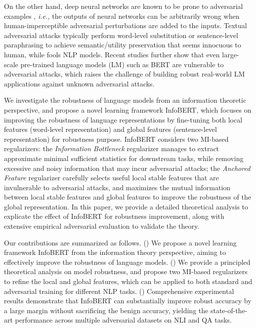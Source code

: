 \documentclass{article} \usepackage{iclr2021_conference,times}
\theoremstyle{definition}
\theoremstyle{remark}
\newcommand{\method}{InfoBERT\xspace}
\begin{document}
On the other hand, deep neural networks are known to be prone to adversarial examples \citep{Goodfellow2015ExplainingAH,Papernot2016DistillationAA,Eykholt2017RobustPA,MoosaviDezfooli2016DeepFoolAS}, \emph{i.e.,} the outputs of neural networks can be arbitrarily wrong when human-imperceptible adversarial perturbations are added to the inputs. Textual adversarial attacks typically perform word-level substitution \citep{hotflip, DBLP:conf/emnlp/AlzantotSEHSC18,weight_attack} or sentence-level paraphrasing \citep{scpn,DBLP:conf/naacl/ZhangBH19} to achieve semantic/utility preservation that seems innocuous to human, while fools NLP models. Recent studies \citep{textfooler, comattack, anli, t3} further show that even large-scale pre-trained language models (LM) such as BERT are vulnerable to adversarial attacks, which raises the challenge of building robust real-world LM applications against unknown adversarial attacks.

We investigate the robustness of language models from an information theoretic perspective, and propose a novel learning framework \method, which focuses on improving the robustness of language representations by fine-tuning both local features (word-level representation) and global features (sentence-level representation) for robustness purpose. \method considers two MI-based regularizers:  the \emph{Information Bottleneck} regularizer manages to extract approximate minimal sufficient statistics for downstream tasks, while removing excessive and noisy information that may incur adversarial attacks;  the \emph{Anchored Feature} regularizer carefully selects useful local stable features that are invulnerable to adversarial attacks, and maximizes the mutual information between local stable features and global features to improve the robustness of the global representation. In this paper, we provide a detailed theoretical analysis to explicate the effect of \method for robustness improvement, along with extensive empirical adversarial evaluation to validate the theory.

Our contributions are summarized as follows. () We propose a novel learning framework \method from the information theory perspective, aiming to effectively improve the robustness of language models. () We provide a principled theoretical analysis on model robustness, and propose two MI-based regularizers to refine the local and global features, which can be applied to both standard and adversarial training for different NLP tasks. () Comprehensive experimental results demonstrate that \method can substantially improve robust accuracy by a large margin without sacrificing the benign accuracy, yielding the state-of-the-art performance across multiple adversarial datasets on NLI and QA tasks.  \vspace{-1mm} 
\end{document}
